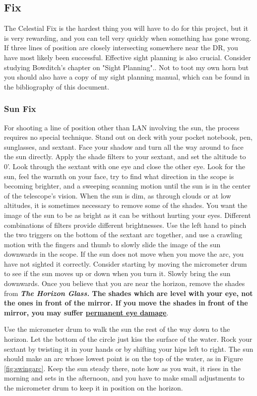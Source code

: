 \documentclass[letterpaper,12pt]{article}
\begin{document}
\subsection{Fix}
The Celestial Fix is the hardest thing you will have to do for this project, but it is very rewarding, and you can tell very quickly when something has gone wrong.
If three lines of position are closely intersecting somewhere near the DR, you have most likely been successful.
Effective sight planning is also crucial. Consider studying Bowditch's chapter on "Sight Planning"..
Not to toot my own horn but you should also have a copy of my sight planning manual, which can be found in the bibliography of this document.

\subsubsection*{Sun Fix}
For shooting a line of position other than LAN involving the sun, the process requires no special technique.
Stand out on deck with your pocket notebook, pen, sunglasses, and sextant.
Face your shadow and turn all the way around to face the sun directly.
Apply the shade filters to your sextant, and set the altitude to 0'.
Look through the sextant with one eye and close the other eye.
Look for the sun, feel the warmth on your face, try to find what direction in the scope is becoming brighter, and a sweeping scanning motion until the sun is in the center of the telescope's vision.
When the sun is dim, as through clouds or at low altitudes, it is sometimes necessary to remove some of the shades.
You want the image of the sun to be as bright as it can be without hurting your eyes.
Different combinations of filters provide different brightnesses.
Use the left hand to pinch the two triggers on the bottom of the sextant arc together, and use a crawling motion with the fingers and thumb to slowly slide the image of the sun downwards in the scope.
If the sun does not move when you move the arc, you have not sighted it correctly.
Consider starting by moving the micrometer drum to see if the sun moves up or down when you turn it.
Slowly bring the sun downwards. Once you believe that you are near the horizon, remove the shades from \textbf{\emph{The Horizon Glass.}
The shades which are level with your eye, not the ones in front of the mirror.
If you move the shades in front of the mirror, you may suffer \underline{permanent eye damage}}.

Use the micrometer drum to walk the sun the rest of the way down to the horizon.
Let the bottom of the circle just kiss the surface of the water.
Rock your sextant by twisting it in your hands or by shifting your hips left to right.
The sun should make an arc whose lowest point is on the top of the water, as in Figure \ref{fig:swingarc}.
Keep the sun steady there, note how as you wait, it rises in the morning and sets in the afternoon, and you have to make small adjustments to the micrometer drum to keep it in position on the horizon.
\end{document}
